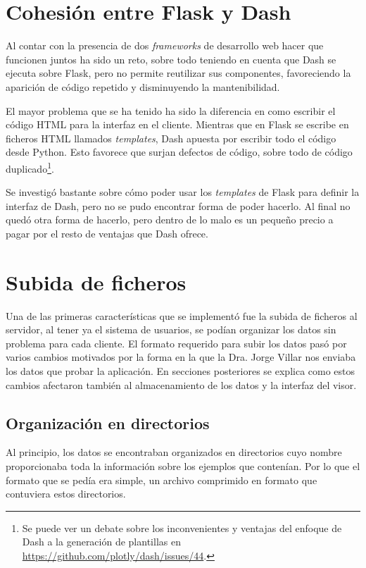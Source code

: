 \section{Cohesión entre Flask y Dash}

Al contar con la presencia de dos \textit{frameworks} de desarrollo web hacer
que funcionen juntos ha sido un reto, sobre todo teniendo en cuenta que Dash se
ejecuta sobre Flask, pero no permite reutilizar sus componentes, favoreciendo la
aparición de código repetido y disminuyendo la mantenibilidad.

El mayor problema que se ha tenido ha sido la diferencia en como escribir el
código HTML para la interfaz en el cliente. Mientras que en Flask se escribe en
ficheros HTML llamados \textit{templates}, Dash apuesta por escribir todo el
código desde Python. Esto favorece que surjan defectos de código, sobre todo de
código duplicado\footnote{Se puede ver un debate sobre los inconvenientes y 
ventajas del enfoque de Dash a la generación de plantillas en 
\url{https://github.com/plotly/dash/issues/44}.}.

Se investigó bastante sobre cómo poder usar los \textit{templates} de Flask para
definir la interfaz de Dash, pero no se pudo encontrar forma de poder hacerlo. 
Al final no quedó otra forma de hacerlo, pero dentro de lo malo es un pequeño
precio a pagar por el resto de ventajas que Dash ofrece.

\section{Subida de ficheros}\label{sec:subida}

Una de las primeras características que se implementó fue la subida de ficheros
al servidor, al tener ya el sistema de usuarios, se podían organizar los datos
sin problema para cada cliente. El formato requerido para subir los datos pasó
por varios cambios motivados por la forma en la que la Dra. Jorge Villar nos
enviaba los datos que probar la aplicación. En secciones posteriores se explica
como estos cambios afectaron también al almacenamiento de los datos y la
interfaz del visor.

\subsection{Organización en directorios}\label{sec:directorios}

Al principio, los datos se encontraban organizados en directorios cuyo nombre
proporcionaba toda la información sobre los ejemplos que contenían. Por lo que
el formato que se pedía era simple, un archivo comprimido en formato 
que contuviera estos directorios.

